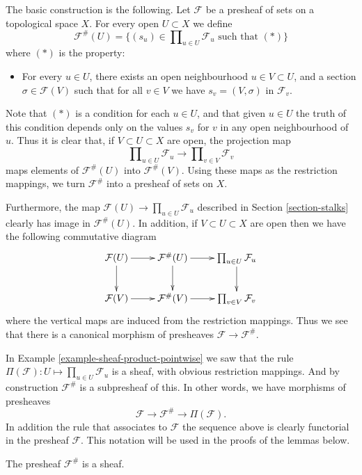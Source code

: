 \medskip\noindent
The basic construction is the following. Let $\mathcal{F}$ be a presheaf
of sets on a topological space $X$.
For every open $U \subset X$ we define
$$
\mathcal{F}^{\#}(U)
=
\{
(s_u) \in \prod\nolimits_{u \in U} \mathcal{F}_u
\text{ such that }(*)
\}
$$
where $(*)$ is the property:
\begin{itemize}
\item[(*)] For every $u \in U$, there exists an open neighbourhood
$u \in V \subset U$, and a section $\sigma \in \mathcal{F}(V)$
such that for all $v \in V$ we have $s_v = (V, \sigma)$
in $\mathcal{F}_v$.
\end{itemize}
Note that $(*)$ is a condition for each $u \in U$,
and that given $u \in U$ the truth of this condition
depends only on the values $s_v$ for $v$ in any open neighbourhood
of $u$. Thus it is clear that,
if $V \subset U \subset X$ are open, the projection map
$$
\prod\nolimits_{u \in U} \mathcal{F}_u
\longrightarrow
\prod\nolimits_{v \in V} \mathcal{F}_v
$$
maps elements of $\mathcal{F}^{\#}(U)$ into $\mathcal{F}^{\#}(V)$.
Using these maps as the restriction mappings, we turn $\mathcal{F}^\#$
into a presheaf of sets on $X$.

\medskip\noindent
Furthermore, the map $\mathcal{F}(U) \to \prod_{u \in U} \mathcal{F}_u$
described in Section \ref{section-stalks} clearly has image
in $\mathcal{F}^{\#}(U)$. In addition, if $V \subset U \subset X$ are
open then we have the following commutative diagram
$$
\xymatrix{
\mathcal{F}(U) \ar[r] \ar[d] &
\mathcal{F}^{\#}(U) \ar[r] \ar[d] &
\prod_{u\in U} \mathcal{F}_u \ar[d] \\
\mathcal{F}(V) \ar[r] &
\mathcal{F}^{\#}(V) \ar[r] &
\prod_{v\in V} \mathcal{F}_v
}
$$
where the vertical maps are induced from the
restriction mappings. Thus we see that
there is a canonical morphism of presheaves
$\mathcal{F} \to \mathcal{F}^{\#}$.

\medskip\noindent
In Example \ref{example-sheaf-product-pointwise} we saw
that the rule $\Pi(\mathcal{F}) : U \mapsto \prod_{u\in U} \mathcal{F}_u$
is a sheaf, with obvious restriction mappings. And by construction
$\mathcal{F}^{\#}$ is a subpresheaf of this. In other words, we
have morphisms of presheaves
$$
\mathcal{F} \to \mathcal{F}^\# \to \Pi(\mathcal{F}).
$$
In addition the rule that associates to $\mathcal{F}$
the sequence above is clearly functorial in the presheaf $\mathcal{F}$.
This notation will be
used in the proofs of the lemmas below.

\begin{lemma}
\label{lemma-sheafification-sheaf}
\begin{reference}
\cite[Chapter I, \S 1, no. 3, pp. 200--201]{FAC}
\end{reference}
The presheaf $\mathcal{F}^{\#}$ is a sheaf.
\end{lemma}

